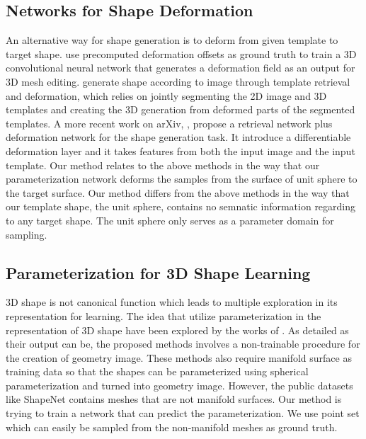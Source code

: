 \subsection{Networks for Shape Deformation}
An alternative way for shape generation is to deform from given template to target shape. \cite{deformflow} use precomputed deformation offsets as ground truth to train a 3D convolutional neural network that generates a deformation field as an output for 3D mesh editing. \cite{Huang:2015:SRV:2809654.2766890} generate shape according to image through template retrieval and
deformation, which relies on jointly segmenting the 2D image and 3D templates and creating the
3D generation from deformed parts of the segmented templates. A more recent work on arXiv, \cite{deformnet}, propose a retrieval network plus deformation network for the shape generation task. It introduce a differentiable deformation layer and it takes features from both the input image and the input template.
Our method relates to the above methods in the way that our parameterization network deforms the samples from the surface of unit sphere to the target surface. Our method differs from the above methods in the way that our template shape, the unit sphere, contains no semnatic information regarding to any target shape. The unit sphere only serves as a parameter domain for sampling.
  
\subsection{Parameterization for 3D Shape Learning}
3D shape is not canonical function which leads to multiple exploration in its representation for learning. The idea that utilize parameterization in the representation of 3D shape have been explored by the works of \cite{surfnet,geoimg}. As detailed as their output can be, the proposed methods involves a non-trainable procedure for the creation of geometry image. These methods also require manifold surface as training data so that the shapes can be parameterized using spherical parameterization and turned into geometry image. However, the public datasets like ShapeNet\cite{shapenetdata} contains meshes that are not manifold surfaces. Our method is trying to train a network that can predict the parameterization. We use point set which can easily be sampled from the non-manifold meshes as ground truth. 
